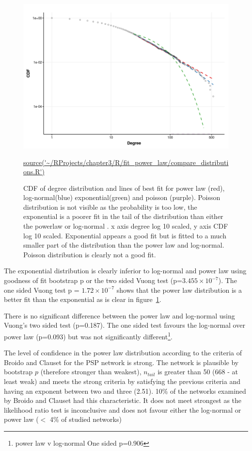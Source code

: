 \begin{figure}
    \centering
    \includegraphics[width=\textwidth]{images/chapter3/poweRlaw/Rplot_models_xmin.png}
    \caption{CDF of degree distribution and lines of best fit for power law (red), log-normal(blue) exponential(green) and poisson (purple). Poisson distribution is not visible as the probability is too low, the exponential is a poorer fit in the tail of the distribution than either the powerlaw or log-normal . x axis degree log 10 scaled, y axis CDF log 10 scaled. Exponential appears a good fit but is fitted to a much smaller part of the distribution than the power law and log-normal. Poisson distribution is clearly not a good fit.}
    \small\url{source('~/RProjects/chapter3/R/fit_power_law/compare_distributions.R')}
    \label{fig:models_set_xmin}
\end{figure}

The exponential distribution is clearly inferior to log-normal and power law using goodness of fit bootstrap p or the two sided Vuong test (p=$3.455\times10^{-7}$). The one sided Vuong test p = $1.72\times10^{-7}$ shows that the power law distribution is a better fit than the exponential as is clear in figure~\ref{fig:models_set_xmin}. 

There is no significant difference between the power law and log-normal using Vuong's two sided test (p=0.187). The one sided test favours the log-normal over power law (p=0.093) but was not significantly different\footnote{power law v log-normal One sided p=0.906}.  

The level of confidence in the power law distribution according to the  criteria of Broido and Clauset\cite{broido2019scale} for the PSP network is strong. The network is plausible by bootstrap $p$ (therefore stronger than weakest), $n_{tail}$ is greater than 50 (668 - at least weak) and meets the strong criteria by satisfying the previous criteria and having an exponent between two and three (2.51). 10\% of the networks examined by Broido and Clauset had this characteristic. It does not meet strongest as the likelihood ratio test is inconclusive and does not favour either the log-normal or power law ($<$ 4\% of studied networks)




